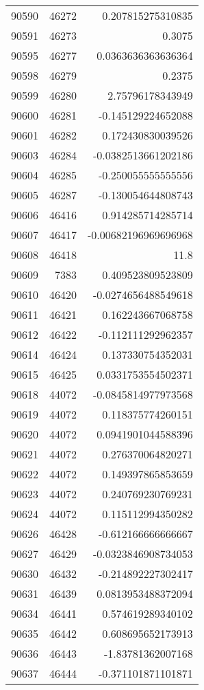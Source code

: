 \begin{tabular}{r | r | r}
90590 & 46272 & 0.207815275310835 \\
90591 & 46273 & 0.3075 \\
90595 & 46277 & 0.0363636363636364 \\
90598 & 46279 & 0.2375 \\
90599 & 46280 & 2.75796178343949 \\
90600 & 46281 & -0.145129224652088 \\
90601 & 46282 & 0.172430830039526 \\
90603 & 46284 & -0.0382513661202186 \\
90604 & 46285 & -0.250055555555556 \\
90605 & 46287 & -0.130054644808743 \\
90606 & 46416 & 0.914285714285714 \\
90607 & 46417 & -0.00682196969696968 \\
90608 & 46418 & 11.8 \\
90609 & 7383 & 0.409523809523809 \\
90610 & 46420 & -0.0274656488549618 \\
90611 & 46421 & 0.162243667068758 \\
90612 & 46422 & -0.112111292962357 \\
90614 & 46424 & 0.137330754352031 \\
90615 & 46425 & 0.0331753554502371 \\
90618 & 44072 & -0.0845814977973568 \\
90619 & 44072 & 0.118375774260151 \\
90620 & 44072 & 0.0941901044588396 \\
90621 & 44072 & 0.276370064820271 \\
90622 & 44072 & 0.149397865853659 \\
90623 & 44072 & 0.240769230769231 \\
90624 & 44072 & 0.115112994350282 \\
90626 & 46428 & -0.612166666666667 \\
90627 & 46429 & -0.0323846908734053 \\
90630 & 46432 & -0.214892227302417 \\
90631 & 46439 & 0.0813953488372094 \\
90634 & 46441 & 0.574619289340102 \\
90635 & 46442 & 0.608695652173913 \\
90636 & 46443 & -1.83781362007168 \\
90637 & 46444 & -0.371101871101871 \\

\end{tabular}
